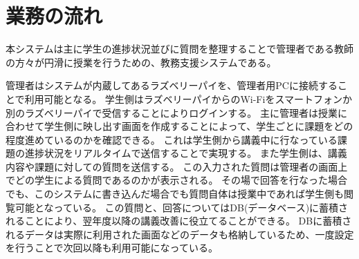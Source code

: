\section{業務の流れ}
本システムは主に学生の進捗状況並びに質問を整理することで管理者である教師の方々が円滑に授業を行うための、教務支援システムである。

管理者はシステムが内蔵してあるラズベリーパイを、管理者用PCに接続することで利用可能となる。
学生側はラズベリーパイからのWi-Fiをスマートフォンか別のラズベリーパイで受信することによりログインする。
主に管理者は授業に合わせて学生側に映し出す画面を作成することによって、学生ごとに課題をどの程度進めているのかを確認できる。
これは学生側から講義中に行なっている課題の進捗状況をリアルタイムで送信することで実現する。
また学生側は、講義内容や課題に対しての質問を送信する。
この入力された質問は管理者の画面上でどの学生による質問であるのかが表示される。
その場で回答を行なった場合でも、このシステムに書き込んだ場合でも質問自体は授業中であれば学生側も閲覧可能となっている。
この質問と、回答についてはDB(データベース)に蓄積されることにより、翌年度以降の講義改善に役立てることができる。
DBに蓄積されるデータは実際に利用された画面などのデータも格納しているため、一度設定を行うことで次回以降も利用可能になっている。
